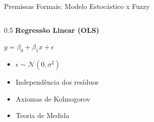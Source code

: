 \documentclass{beamer}
\begin{document}
	\begin{frame}{Premissas Formais: Modelo Estocástico x Fuzzy}                                                                                     
		
		\begin{columns}[T]                                                                                                                           
			
			\begin{column}{0.5\textwidth}                                                                                                            
				\centering                                                                                                                           
				\textbf{Regressão Linear (OLS)}                                                                                                      
				
				\vspace{0.3em}                                                                                                                       
				\footnotesize                                                                                                                        
				$y = \beta_0 + \beta_1 x + \epsilon$                                                                                                 
				
				\vspace{0.5em}                                                                                                                       
				\begin{itemize}                                                                                                                      
					\item $\epsilon \sim \mathcal{N}(0, \sigma^2)$                                                                                   
					\item Independência dos resíduos                                                                                                 
					\item Axiomas de Kolmogorov                                                                                                      
					\item Teoria de Medida                                                                                                           
				\end{itemize}                                                                                                                        
				

\end{column}
\end{columns}
\end{frame}
\end{document}
